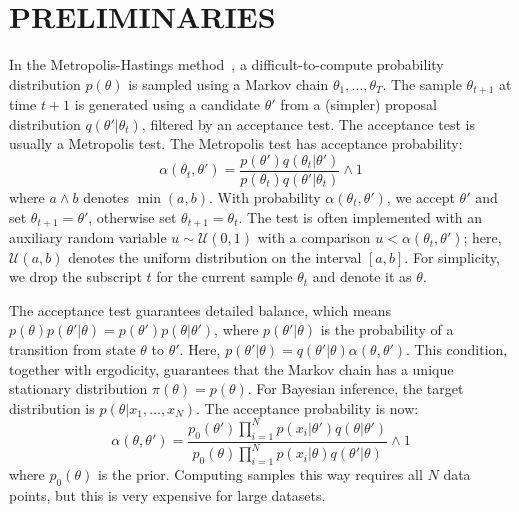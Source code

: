 \documentclass[letterpaper]{article}
\begin{document}
\section{PRELIMINARIES}\label{sec:related_work}

In the Metropolis-Hastings method~\citep{gilks1996markov,brooks2011handbook}, a
difficult-to-compute probability distribution $p(\theta)$ is sampled using a
Markov chain $\theta_1,\ldots,\theta_T$. The sample $\theta_{t+1}$ at time $t+1$
is generated using a candidate $\theta'$ from a (simpler) proposal distribution
$q(\theta'|\theta_t)$, filtered by an acceptance test. The acceptance test
is usually a Metropolis test. The Metropolis test has acceptance probability:
\begin{equation}\label{eq:traditional}
    \alpha(\theta_t,\theta') = \frac{p(\theta')q(\theta_t | \theta')}{p(\theta_t)q(\theta' | \theta_t)} \wedge 1
\end{equation}
where $a \wedge b$ denotes $\min(a,b)$.  With probability
$\alpha(\theta_t,\theta')$, we accept $\theta'$ and set $\theta_{t+1} =
\theta'$, otherwise set $\theta_{t+1}=\theta_t$.  The test is often implemented
with an auxiliary random variable $u \sim \mathcal{U}(0,1)$ with a comparison
$u<\alpha(\theta_t,\theta')$; here, $\mathcal{U}(a,b)$ denotes the uniform
distribution on the interval $[a,b]$.  For simplicity, we drop the subscript $t$
for the current sample $\theta_t$ and denote it as $\theta$. 

The acceptance test guarantees detailed balance, which means
$p(\theta)p(\theta'|\theta) = p(\theta')p(\theta|\theta')$, where
$p(\theta'|\theta)$ is the probability of a transition from state $\theta$ to
$\theta'$. Here, $p(\theta'|\theta)=q(\theta'|\theta)\alpha(\theta,\theta')$.
This condition, together with ergodicity, guarantees that the Markov chain has a
unique stationary distribution $\pi(\theta) = p(\theta)$. For Bayesian
inference, the target distribution is $p(\theta | x_1, \ldots, x_N)$. The
acceptance probability is now:
\begin{equation}\label{eq:acceptance_probability}
    \alpha(\theta,\theta') = 
    \frac{p_0(\theta')\prod_{i=1}^N p(x_i | \theta')q(\theta |
    \theta')}{p_0(\theta)\prod_{i=1}^N p(x_i | \theta)q(\theta' | \theta)}
    \wedge 1
\end{equation}
where $p_0(\theta)$ is the prior. Computing samples this way requires all $N$
data points, but this is very expensive for large datasets.
\end{document}
